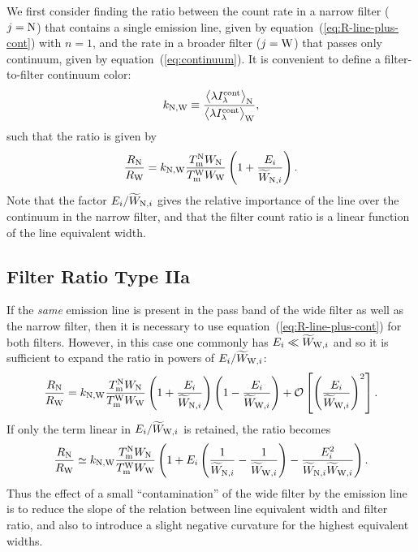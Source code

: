 \documentclass[preprint, 12pt]{aastex}
\begin{document}
We first consider finding the ratio between the count rate in a
narrow filter (\(j = \mathrm{N}\)) that contains a single emission line, 
given by equation~(\ref{eq:R-line-plus-cont}) with \(n=1\), 
and the rate in a broader filter (\(j = \mathrm{W}\)) that passes only
continuum, given by equation~(\ref{eq:continuum}). 
It is convenient to define a filter-to-filter continuum color: 
\begin{equation}
  \label{eq:cont-color}
  k_{\mathrm{N}, \mathrm{W}} \equiv \frac{\bigl\langle \lambda I_\lambda^{\mathrm{cont}} \bigr\rangle_{\mathrm{N}}}{\bigl\langle \lambda I_\lambda^{\mathrm{cont}} \bigr\rangle_{\mathrm{W}}} ,
\end{equation}
such that the ratio is given by
\begin{equation}
  \label{eq:ratio-type-I}
  \frac{R_{\mathrm{N}}}{R_{\mathrm{W}}} = 
  k_{\mathrm{N}, \mathrm{W}} \frac{T_{\mathrm{m}}^{\mathrm{N}} W_{\mathrm{N}}}{T_{\mathrm{m}}^{\mathrm{W}} W_{\mathrm{W}}}
  \left(
    1 + \frac{E_i}{\widetilde{W}_{\mathrm{N}, i}}
  \right) .
\end{equation}
Note that the factor \(E_i / \widetilde{W}_{\mathrm{N}, i}\) gives the relative
importance of the line over the continuum in the narrow filter, and
that the filter count ratio is a linear function of the line
equivalent width. 

\subsection{Filter Ratio Type IIa}
\label{sec:typeIIa}
If the \emph{same} emission line is present in the pass band of the
wide filter as well as the narrow filter, then it is necessary to use
equation~(\ref{eq:R-line-plus-cont}) for both filters.  
However, in this case one commonly has \(E_i \ll \widetilde{W}_{\mathrm{W}, i}\) and so
it is sufficient to expand the ratio in powers of \(E_i /
\widetilde{W}_{\mathrm{W}, i}\):
\begin{equation}
  \label{eq:ratio-type-II}
    \frac{R_{\mathrm{N}}}{R_{\mathrm{W}}} = 
  k_{\mathrm{N}, \mathrm{W}} \frac{T_{\mathrm{m}}^{\mathrm{N}} W_{\mathrm{N}}}{T_{\mathrm{m}}^{\mathrm{W}} W_{\mathrm{W}}}
  \left(
    1 + \frac{E_i}{\widetilde{W}_{\mathrm{N}, i}}
  \right) 
  \left(
    1 - \frac{E_i}{\widetilde{W}_{\mathrm{W}, i}}
  \right)
  + \mathcal{O}\left[ 
    \left(\frac{E_i}{\widetilde{W}_{\mathrm{W}, i}}\right)^2
  \right]
  .
\end{equation}
If only the term linear in \(E_i / \widetilde{W}_{\mathrm{W}, i}\) is retained, the
ratio becomes
\begin{equation}
  \label{eq:ratio-type-II-approx}
    \frac{R_{\mathrm{N}}}{R_{\mathrm{W}}} \simeq
  k_{\mathrm{N}, \mathrm{W}} \frac{T_{\mathrm{m}}^{\mathrm{N}} W_{\mathrm{N}}}{T_{\mathrm{m}}^{\mathrm{W}} W_{\mathrm{W}}}
  \left(
    1 + E_i \left( \frac{1}{\widetilde{W}_{\mathrm{N}, i}} - \frac{1}{\widetilde{W}_{\mathrm{W}, i}} \right)
    - \frac{E_i^2}{\widetilde{W}_{\mathrm{N}, i} \widetilde{W}_{\mathrm{W}, i}}
  \right) 
  .
\end{equation}
Thus the effect of a small ``contamination'' of the wide filter by the
emission line is to reduce the slope of the relation between line
equivalent width and filter ratio, and also to introduce a slight
negative curvature for the highest equivalent widths.
\end{document}
